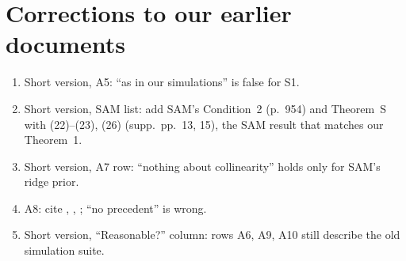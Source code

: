 \documentclass[11pt]{article}
\begin{document}
\section*{Corrections to our earlier documents}
\begin{enumerate}
  \item Short version, A5: ``as in our simulations'' is false for S1.
  \item Short version, SAM list: add SAM's Condition~2 (p.~954) and Theorem~S with (22)--(23), (26) (supp.~pp.~13,
    15), the SAM result that matches our Theorem~1.
  \item Short version, A7 row: ``nothing about collinearity'' holds only for SAM's ridge prior.
  \item A8: cite \citet{BuhlmannKalischMaathuis2010}, \citet{FanLv2008}, \citet{BarutFanVerhasselt2016}; ``no precedent''
    is wrong.
  \item Short version, ``Reasonable?'' column: rows A6, A9, A10 still describe the old simulation suite.
\end{enumerate}



\end{document}
